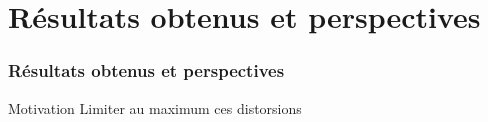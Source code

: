 \section{Résultats obtenus et perspectives}
	\begin{frame}
		\frametitle{Résultats obtenus et perspectives}
		\begin{block}{Motivation}
			Limiter au maximum ces distorsions
		\end{block}	
\end{frame}